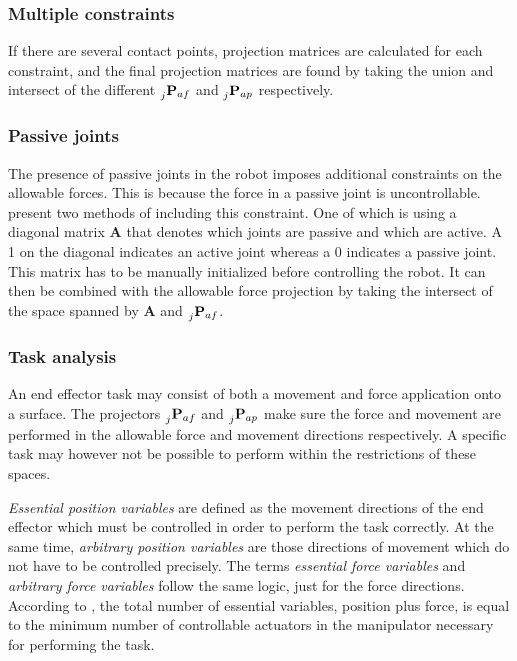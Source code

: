 \subsubsection{Multiple constraints}\label{subseq:mult_contacts}

If there are several contact points, projection matrices are calculated for each constraint, and the final projection matrices are found by taking the union and intersect of the different $\prescript{}{j}{\mathbf{P}}_{af}$ and $\prescript{}{j}{\mathbf{P}}_{ap}$ respectively.

\subsubsection{Passive joints}

The presence of passive joints in the robot imposes additional constraints on the allowable forces. This is because the force in a passive joint is uncontrollable. \cite{west1985method} present two methods of including this constraint. One of which is using a diagonal matrix $\mathbf{A}$ that denotes which joints are passive and which are active. A 1 on the diagonal indicates an active joint whereas a 0 indicates a passive joint. This matrix has to be manually initialized before controlling the robot. It can then be combined with the allowable force projection by taking the intersect of the space spanned by $\mathbf{A}$ and $\prescript{}{j}{\mathbf{P}}_{af}$.

\subsubsection{Task analysis}

An end effector task may consist of both a movement and force application onto a surface. The projectors $\prescript{}{j}{\mathbf{P}}_{af}$ and $\prescript{}{j}{\mathbf{P}}_{ap}$ make sure the force and movement are performed in the allowable force and movement directions respectively. A specific task may however not be possible to perform within the restrictions of these spaces.

\textit{Essential position variables} are defined as the movement directions of the end effector which must be controlled in order to perform the task correctly. At the same time, \textit{arbitrary position variables} are those directions of movement which do not have to be controlled precisely. The terms \textit{essential force variables} and \textit{arbitrary force variables} follow the same logic, just for the force directions. According to \cite{west1985method}, the total number of essential variables, position plus force, is equal to the minimum number of controllable actuators in the manipulator necessary for performing the task.

